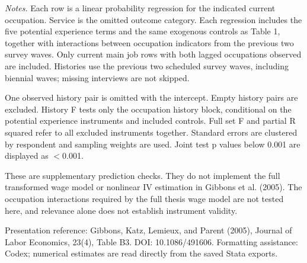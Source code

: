 \medskip
{\footnotesize
\noindent\textit{Notes.} Each row is a linear probability regression for the indicated current occupation. Service is the omitted outcome category. Each regression includes the five potential experience terms and the same exogenous controls as Table 1, together with interactions between occupation indicators from the previous two survey waves. Only current main job rows with both lagged occupations observed are included. Histories use the previous two scheduled survey waves, including biennial waves; missing interviews are not skipped.\par
\smallskip\noindent One observed history pair is omitted with the intercept. Empty history pairs are excluded. History F tests only the occupation history block, conditional on the potential experience instruments and included controls. Full set F and partial R squared refer to all excluded instruments together. Standard errors are clustered by respondent and sampling weights are used. Joint test p values below 0.001 are displayed as $<$0.001.\par
\smallskip\noindent These are supplementary prediction checks. They do not implement the full transformed wage model or nonlinear IV estimation in Gibbons et al. (2005). The occupation interactions required by the full thesis wage model are not tested here, and relevance alone does not establish instrument validity.\par
\smallskip\noindent Presentation reference: Gibbons, Katz, Lemieux, and Parent (2005), Journal of Labor Economics, 23(4), Table B3. DOI: 10.1086/491606. Formatting assistance: Codex; numerical estimates are read directly from the saved Stata exports.\par
}
